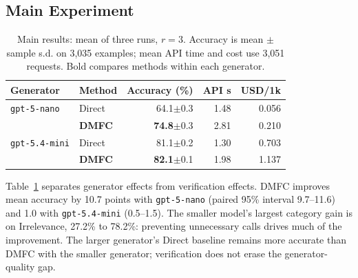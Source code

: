 \subsection{Main Experiment}
\begin{table}[t]
\centering\footnotesize
\setlength{\tabcolsep}{3.5pt}
\begin{tabular}{llrrr}
\toprule
Generator & Method & Accuracy (\%) & API s & USD/1k\\
\midrule
\texttt{gpt-5-nano} & Direct & 64.1$\pm$0.3 & 1.48 & 0.056\\
 & \textbf{DMFC} & \textbf{74.8}$\pm$0.3 & 2.81 & 0.210\\
\texttt{gpt-5.4-mini} & Direct & 81.1$\pm$0.2 & 1.30 & 0.703\\
 & \textbf{DMFC} & \textbf{82.1}$\pm$0.1 & 1.98 & 1.137\\
\bottomrule
\end{tabular}
\caption{Main results: mean of three runs, $r=3$. Accuracy is mean $\pm$ sample s.d. on 3,035 examples; mean API time and cost use 3,051 requests. Bold compares methods within each generator.}
\label{tab:categories}
\end{table}
Table~\ref{tab:categories} separates generator effects from verification effects. DMFC improves mean accuracy by 10.7 points with \texttt{gpt-5-nano} (paired 95\% interval 9.7--11.6) and 1.0 with \texttt{gpt-5.4-mini} (0.5--1.5). The smaller model's largest category gain is on Irrelevance, 27.2\% to 78.2\%: preventing unnecessary calls drives much of the improvement. The larger generator's Direct baseline remains more accurate than DMFC with the smaller generator; verification does not erase the generator-quality gap.

